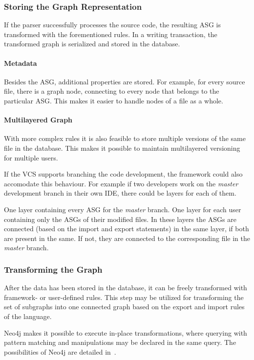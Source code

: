 \subsubsection{Storing the Graph Representation}
If the parser successfully processes the source code, the resulting ASG is transformed with the forementioned rules. In a writing transaction, the transformed graph is serialized and stored in the database.

\paragraph{Metadata}
Besides the ASG, additional properties are stored. For example, for every source file, there is a graph node, connecting to every node that belongs to the particular ASG. This makes it easier to handle nodes of a file as a whole.

\paragraph{Multilayered Graph}
With more complex rules it is also feasible to store multiple versions of the same file in the database. This makes it possible to maintain multilayered versioning for multiple users.

If the VCS supports branching the code development, the framework could also accomodate this behaviour. For example if two developers work on the \emph{master} development branch in their own IDE, there could be layers for each of them.

One layer containing every ASG for the \emph{master} branch. One layer for each user containing only the ASGs of their modified files. In these layers the ASGs are connected (based on the import and export statements) in the same layer, if both are present in the same. If not, they are connected to the corresponding file in the \emph{master} branch. %

\subsubsection{Transforming the Graph}
After the data has been stored in the database, it can be freely transformed with framework- or user-defined rules. This step may be utilized for transforming the set of subgraphs into one connected graph based on the export and import rules of the language.

Neo4j makes it possible to execute in-place transformations, where querying with pattern matching and manipulations may be declared in the same query. The possibilities of Neo4j are detailed in~.

